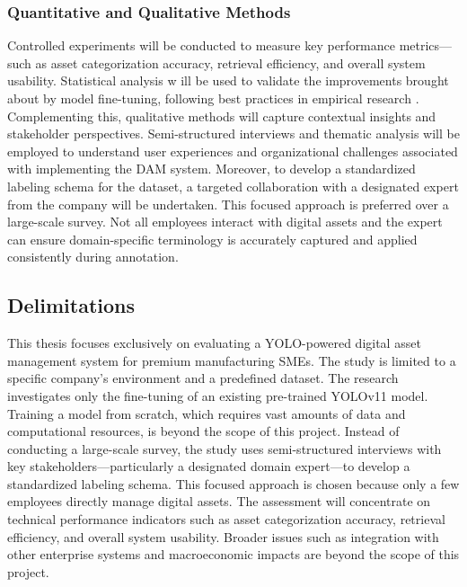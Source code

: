 \documentclass[a4paper,10pt,twocolumn]{article}
\numberwithin{figure}{section}
\numberwithin{table}{section}
\begin{document}
\subsubsection{Quantitative and Qualitative Methods }
\vspace{0.3cm}
Controlled experiments will be conducted to measure key performance 
metrics—such as asset categorization accuracy, retrieval efficiency, 
and overall system usability. Statistical analysis w
ill be used to validate the improvements brought about by model fine-tuning, 
following best practices in empirical research \citep{creswell2014, yin2014case}.
Complementing this, qualitative methods will capture contextual insights and 
stakeholder perspectives. Semi-structured interviews and thematic analysis 
will be employed to understand user experiences and organizational challenges 
associated with implementing the DAM system. 
Moreover, to develop a standardized 
labeling schema for the dataset, a targeted collaboration with a designated 
expert from the company will be undertaken. This focused approach is 
preferred over a large-scale survey. Not all employees interact 
with digital assets and the expert can ensure domain-specific 
terminology is accurately captured and applied consistently during annotation.

\subsection{Delimitations}
This thesis focuses exclusively on evaluating a YOLO-powered digital asset management 
system for premium manufacturing SMEs. The study is limited to a specific company’s 
environment and a predefined dataset.
The research investigates only the fine-tuning of an existing pre-trained YOLOv11 model. 
Training a model from scratch, which requires vast amounts of data and computational resources, 
is beyond the scope of this project.
Instead of conducting a large-scale survey, the study uses semi-structured interviews with key 
stakeholders—particularly a designated domain expert—to develop a standardized labeling schema. 
This focused approach is chosen because only a few employees directly manage digital assets.
The assessment will concentrate on technical performance indicators such as asset categorization accuracy, 
retrieval efficiency, and overall system usability. Broader issues such as integration with other enterprise systems 
and macroeconomic impacts are beyond the scope of this project.
\end{document}
